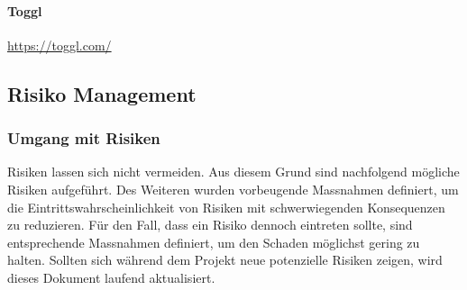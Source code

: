 \paragraph{Toggl} \href{https://toggl.com/}{https://toggl.com/}
 
\subsection{Risiko Management}

\subsubsection{Umgang mit Risiken}

Risiken lassen sich nicht vermeiden. Aus diesem Grund sind nachfolgend mögliche Risiken aufgeführt. Des Weiteren wurden vorbeugende Massnahmen definiert, um die Eintrittswahrscheinlichkeit von Risiken mit schwerwiegenden Konsequenzen zu reduzieren. Für den Fall, dass ein Risiko dennoch eintreten sollte, sind entsprechende Massnahmen definiert, um den Schaden möglichst gering zu halten.
Sollten sich während dem Projekt neue potenzielle Risiken zeigen, wird dieses Dokument laufend aktualisiert.

